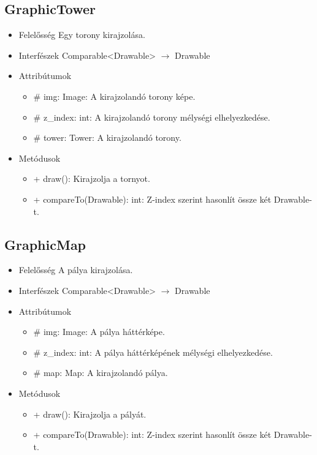 \subsection{GraphicTower}
\begin{itemize}
\item Felelősség\newline
Egy torony kirajzolása.
\item Interfészek\newline
Comparable<Drawable> $\rightarrow$ Drawable
\item Attribútumok\newline
	\begin{itemize}
		\item \# img: Image: A kirajzolandó torony képe.
		\item \# z\_index: int: A kirajzolandó torony mélységi elhelyezkedése.
		\item \# tower: Tower: A kirajzolandó torony.
	\end{itemize}
\item Metódusok\newline
	\begin{itemize}
		\item + draw(): Kirajzolja a tornyot.
		\item + compareTo(Drawable): int: Z-index szerint hasonlít össze két Drawable-t.
	\end{itemize}
\end{itemize}

\subsection{GraphicMap}
\begin{itemize}
\item Felelősség\newline
A pálya kirajzolása.
\item Interfészek\newline
Comparable<Drawable> $\rightarrow$ Drawable
\item Attribútumok\newline
	\begin{itemize}
		\item \# img: Image: A pálya háttérképe.
		\item \# z\_index: int: A pálya háttérképének mélységi elhelyezkedése.
		\item \# map: Map: A kirajzolandó pálya.
	\end{itemize}
\item Metódusok\newline
	\begin{itemize}
		\item + draw(): Kirajzolja a pályát.
		\item + compareTo(Drawable): int: Z-index szerint hasonlít össze két Drawable-t.
	\end{itemize}
\end{itemize}

